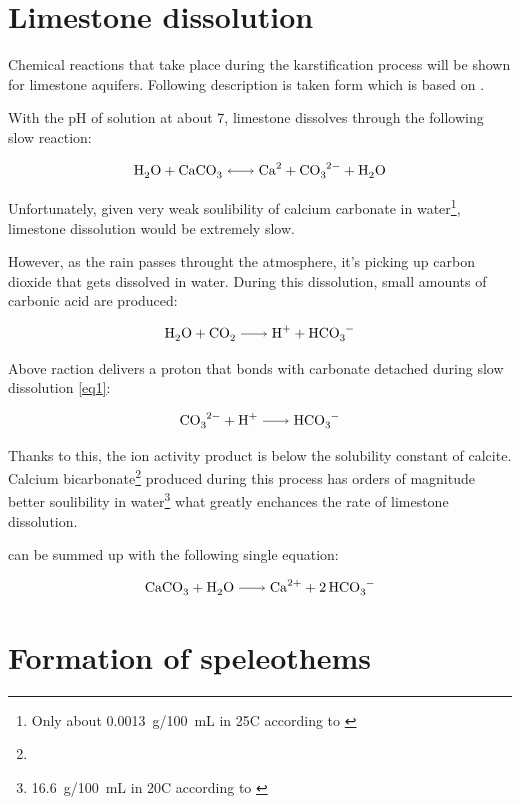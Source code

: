 \section{Limestone dissolution}

Chemical reactions that take place during the karstification process will be
shown for limestone aquifers. Following description is taken form \cite{dreybrodt2002}
which is based on \cite{plummer1978}.

With the pH of solution at about 7, limestone dissolves through the following
slow reaction:

\begin{equation}
  \cee{H2O + CaCO3 <-> Ca^2 + CO3^2- + H2O}
  \label{eq1}
\end{equation}

Unfortunately, given very weak soulibility of calcium carbonate in water\footnote{Only about 0.0013~g/100~mL in 25\degree C according to \cite{aylward2008si}},
limestone dissolution would be extremely slow.

However, as the rain passes throught the atmosphere, it's picking up carbon
dioxide that gets dissolved in water. During this dissolution, small amounts of
carbonic acid are produced:

\begin{equation}
  \cee{H2O + CO2 -> H^+ + HCO3^-}
  \label{eq2}
\end{equation}

Above raction delivers a proton that bonds with carbonate detached during slow
dissolution \ref{eq1}:

\begin{equation}
  \ce{CO3^2- + H^+ -> HCO3^-}
  \label{eq3}
\end{equation}

Thanks to this, the ion activity product   is below the
solubility constant of calcite. Calcium bicarbonate\footnote{} produced
during this process has orders of magnitude better soulibility in water\footnote{16.6~g/100~mL in 20\degree C according to \cite{aylward2008si}}
what greatly enchances the rate of limestone dissolution.

 can be summed up with the following single
equation:

\begin{equation}
  \ce{CaCO3 + H2O -> Ca^2+ + 2HCO3^- }
  \label{eq4}
\end{equation}

\section{Formation of speleothems}

